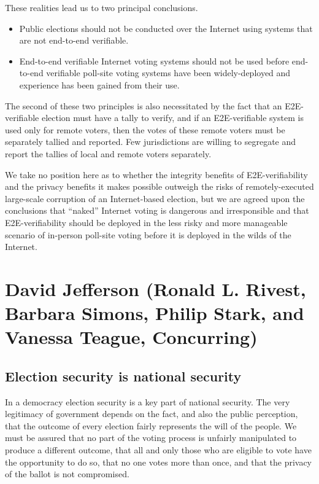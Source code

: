 These realities lead us to two principal conclusions.

\begin{itemize}
\item Public elections should not be conducted over the Internet
using systems that are not end-to-end verifiable.

\item End-to-end verifiable Internet voting systems should not be
used before end-to-end verifiable poll-site voting systems have been
widely-deployed and experience has been gained from their use.
\end{itemize}

The second of these two principles is also necessitated by the fact
that an E2E-verifiable election must have a tally to verify, and if an
E2E-verifiable system is used only for remote voters, then the votes
of these remote voters must be separately tallied and reported.  Few
jurisdictions are willing to segregate and report the tallies of local
and remote voters separately. 

We take no position here as to whether the integrity benefits of
E2E-verifiability and the privacy benefits it makes possible outweigh
the risks of remotely-executed large-scale corruption of an
Internet-based election, but we are agreed upon the conclusions that
“naked” Internet voting is dangerous and irresponsible and that
E2E-verifiability should be deployed in the less risky and more
manageable scenario of in-person poll-site voting before it is
deployed in the wilds of the Internet.

\section{David Jefferson (Ronald L. Rivest, Barbara Simons, Philip
  Stark, and Vanessa Teague, Concurring)}

\subsection{Election security is national security}

In a democracy election security is a key part of national
security. The very legitimacy of government depends on the fact, and
also the public perception, that the outcome of every election fairly
represents the will of the people. We must be assured that no part of
the voting process is unfairly manipulated to produce a different
outcome, that all and only those who are eligible to vote have the
opportunity to do so, that no one votes more than once, and that the
privacy of the ballot is not compromised.

